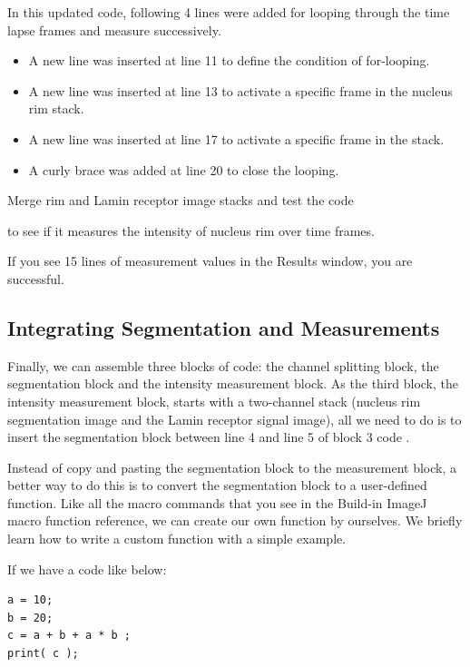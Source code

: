 In this updated code, following 4 lines were added for looping through the time lapse frames and measure successively. 
\begin{itemize}
    \item A new line was inserted at line 11 to define the condition of for-looping.
    \item A new line was inserted at line 13 to activate a specific frame in the nucleus rim stack.
    \item A new line was inserted at line 17 to activate a specific frame in the stack.
    \item A curly brace was added at line 20 to close the looping.
\end{itemize}

\begin{indentexercise}{4}
Merge rim and Lamin receptor image stacks and test the code 


to see if it measures the intensity of nucleus rim over time frames. 

If you see 15 lines of measurement values in the Results window, you are successful. 
\end{indentexercise}

\subsection{Integrating Segmentation and Measurements}

Finally, we can assemble three blocks of code: the channel splitting block, the segmentation block and the intensity measurement block. As the third block, the intensity measurement block, starts with a two-channel stack (nucleus rim segmentation image and the Lamin receptor signal image), all we need to do is to insert the segmentation block between line 4 and line 5 of block 3 code . 

Instead of copy and pasting the segmentation block to the measurement block, a better way to do this is to convert the segmentation block to a user-defined function. Like all the macro commands that you see in the Build-in ImageJ macro function reference, we can create our own function by ourselves. We briefly learn how to write a custom function with a simple example. 

If we have a code like below:

\begin{lstlisting}
a = 10;
b = 20;
c = a + b + a * b ;
print( c );
\end{lstlisting}

